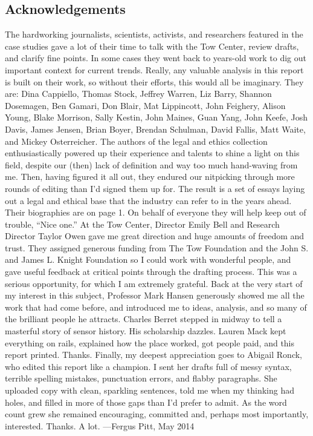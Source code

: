 \begin{itemize}
\chapter{Acknowledgements}
The hardworking journalists, scientists, activists, and researchers featured in the
case studies gave a lot of their time to talk with the Tow Center, review drafts, and
clarify fine points. In some cases they went back to years-old work to dig out important
context for current trends. Really, any valuable analysis in this report is built on
their work, so without their efforts, this would all be imaginary. They are: Dina Cappiello,
Thomas Stock, Jeffrey Warren, Liz Barry, Shannon Dosemagen, Ben Gamari,
Don Blair, Mat Lippincott, John Feighery, Alison Young, Blake Morrison, Sally Kestin,
John Maines, Guan Yang, John Keefe, Josh Davis, James Jensen, Brian Boyer,
Brendan Schulman, David Fallis, Matt Waite, and Mickey Osterreicher.
The authors of the legal and ethics collection enthusiastically powered up their experience
and talents to shine a light on this field, despite our (then) lack of definition
and way too much hand-waving from me. Then, having figured it all out, they
endured our nitpicking through more rounds of editing than I'd signed them up for.
The result is a set of essays laying out a legal and ethical base that the industry can
refer to in the years ahead. Their biographies are on page 1. On behalf of everyone
they will help keep out of trouble, ``Nice one.''
At the Tow Center, Director Emily Bell and Research Director Taylor Owen gave me
great direction and huge amounts of freedom and trust. They assigned generous funding
from The Tow Foundation and the John S. and James L. Knight Foundation so I
could work with wonderful people, and gave useful feedback at critical points through
the drafting process. This was a serious opportunity, for which I am extremely grateful.
Back at the very start of my interest in this subject, Professor Mark Hansen generously
showed me all the work that had come before, and introduced me to ideas,
analysis, and so many of the brilliant people he attracts. Charles Berret stepped in
midway to tell a masterful story of sensor history. His scholarship dazzles. Lauren
Mack kept everything on rails, explained how the place worked, got people paid, and
this report printed. Thanks.
Finally, my deepest appreciation goes to Abigail Ronck, who edited this report like a
champion. I sent her drafts full of messy syntax, terrible spelling mistakes, punctuation
errors, and flabby paragraphs. She uploaded copy with clean, sparkling sentences,
told me when my thinking had holes, and filled in more of those gaps than I'd
prefer to admit. As the word count grew she remained encouraging, committed and,
perhaps most importantly, interested.
Thanks. A lot.
—Fergus Pitt, May 2014





\end{itemize}

